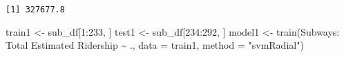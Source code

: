 \documentclass[
  letterpaper,
  DIV=11,
  numbers=noendperiod]{scrartcl}
\newenvironment{Shaded}{\begin{snugshade}}{\end{snugshade}}
\newcommand{\AttributeTok}[1]{\textcolor[rgb]{0.40,0.45,0.13}{#1}}
\newcommand{\DecValTok}[1]{\textcolor[rgb]{0.68,0.00,0.00}{#1}}
\newcommand{\FunctionTok}[1]{\textcolor[rgb]{0.28,0.35,0.67}{#1}}
\newcommand{\NormalTok}[1]{\textcolor[rgb]{0.00,0.23,0.31}{#1}}
\newcommand{\OtherTok}[1]{\textcolor[rgb]{0.00,0.23,0.31}{#1}}
\newcommand{\SpecialCharTok}[1]{\textcolor[rgb]{0.37,0.37,0.37}{#1}}
\newcommand{\StringTok}[1]{\textcolor[rgb]{0.13,0.47,0.30}{#1}}
\begin{document}
\begin{Shaded}
\end{Shaded}

\begin{verbatim}
[1] 327677.8
\end{verbatim}

\begin{Shaded}
\begin{Highlighting}[]
\NormalTok{train1 }\OtherTok{\textless{}{-}}\NormalTok{ sub\_df[}\DecValTok{1}\SpecialCharTok{:}\DecValTok{233}\NormalTok{, ]}
\NormalTok{test1 }\OtherTok{\textless{}{-}}\NormalTok{ sub\_df[}\DecValTok{234}\SpecialCharTok{:}\DecValTok{292}\NormalTok{, ]}
\NormalTok{model1 }\OtherTok{\textless{}{-}} \FunctionTok{train}\NormalTok{(}\StringTok{\textasciigrave{}}\AttributeTok{Subways: Total Estimated Ridership}\StringTok{\textasciigrave{}} \SpecialCharTok{\textasciitilde{}}\NormalTok{ ., }\AttributeTok{data =}\NormalTok{ train1, }\AttributeTok{method =} \StringTok{"svmRadial"}\NormalTok{)}
\end{Highlighting}
\end{Shaded}
\end{document}
